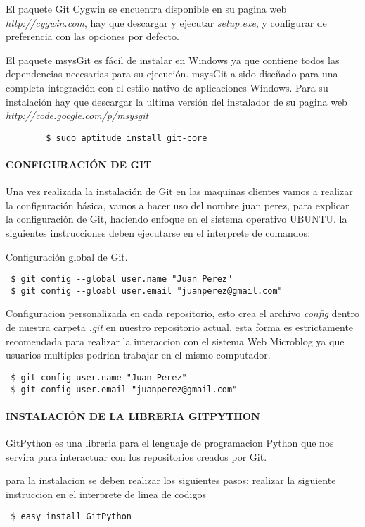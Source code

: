 El paquete Git Cygwin se encuentra disponible en su pagina web \textit{http://cygwin.com}, hay que descargar y ejecutar \textit{setup.exe}, y configurar de preferencia
con las opciones por defecto.

El paquete msysGit es fácil de instalar en Windows ya que contiene todos las dependencias necesarias para su ejecución. msysGit a sido diseñado para una completa integración 
con el estilo nativo de aplicaciones Windows. Para su instalación hay que descargar la ultima versión del instalador de su pagina web \textit{http://code.google.com/p/msysgit}

\begin{proc}
	\begin{verbatim}
 		$ sudo aptitude install git-core
	\end{verbatim}
\end{proc}
\paragraph{CONFIGURACIÓN DE GIT}
Una vez realizada la instalación de Git en las maquinas clientes vamos a realizar la configuración básica, vamos a hacer uso del nombre juan perez, para explicar la configuración de Git, haciendo enfoque en el sistema operativo UBUNTU.
la siguientes instrucciones deben ejecutarse en el interprete de comandos:

Configuración global de Git.
\begin{verbatim}
 $ git config --global user.name "Juan Perez"
 $ git config --gloabl user.email "juanperez@gmail.com"
\end{verbatim}
Configuracion personalizada en cada repositorio, esto crea el archivo \textit{config} dentro de nuestra carpeta \textit{.git} en nuestro repositorio actual, esta forma es
estrictamente recomendada para realizar la interaccion con el sistema Web Microblog ya que usuarios multiples podrian trabajar en el mismo computador.
\begin{verbatim}
 $ git config user.name "Juan Perez"
 $ git config user.email "juanperez@gmail.com"
\end{verbatim}
\paragraph{INSTALACIÓN DE LA LIBRERIA GITPYTHON}
GitPython es una libreria para el lenguaje de programacion Python que nos servira para interactuar con
los repositorios creados por Git.

para la instalacion se deben realizar los siguientes pasos:
realizar la siguiente instruccion en el interprete de linea de codigos
\begin{verbatim}
 $ easy_install GitPython
\end{verbatim}

